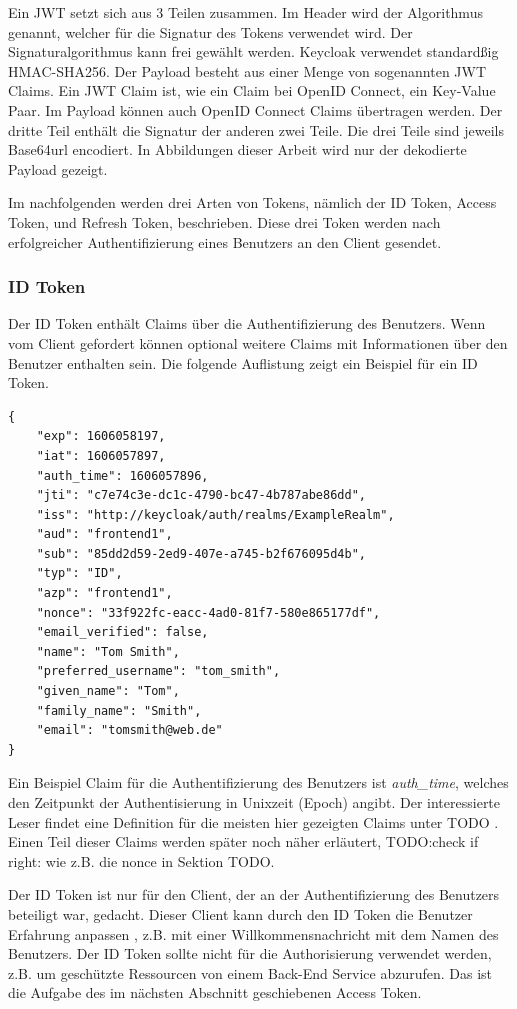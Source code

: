Ein JWT setzt sich aus 3 Teilen zusammen. Im Header wird der Algorithmus genannt, welcher für die Signatur des Tokens verwendet wird. Der Signaturalgorithmus kann frei gewählt werden. Keycloak verwendet standardßig HMAC-SHA256. Der Payload besteht aus einer Menge von sogenannten JWT Claims. Ein JWT Claim ist, wie ein Claim bei OpenID Connect, ein Key-Value Paar. Im Payload können auch OpenID Connect Claims übertragen werden. Der dritte Teil enthält die Signatur der anderen zwei Teile. Die drei Teile sind jeweils Base64url encodiert. In Abbildungen dieser Arbeit wird nur der dekodierte Payload gezeigt.

Im nachfolgenden werden drei Arten von Tokens, nämlich der ID Token, Access Token, und Refresh Token, beschrieben. Diese drei Token werden nach erfolgreicher Authentifizierung eines Benutzers an den Client gesendet.

\subsubsection{ID Token}

Der ID Token enthält Claims über die Authentifizierung des Benutzers. Wenn vom Client gefordert können optional weitere Claims mit Informationen über den Benutzer enthalten sein. Die folgende Auflistung zeigt ein Beispiel für ein ID Token.

\begin{lstlisting}[caption=Beispiel ID Token, captionpos=b]
{
	"exp": 1606058197,
	"iat": 1606057897,
	"auth_time": 1606057896,
	"jti": "c7e74c3e-dc1c-4790-bc47-4b787abe86dd",
	"iss": "http://keycloak/auth/realms/ExampleRealm",
	"aud": "frontend1",
	"sub": "85dd2d59-2ed9-407e-a745-b2f676095d4b",
	"typ": "ID",
	"azp": "frontend1",
	"nonce": "33f922fc-eacc-4ad0-81f7-580e865177df",
	"email_verified": false,
	"name": "Tom Smith",
	"preferred_username": "tom_smith",
	"given_name": "Tom",
	"family_name": "Smith",
	"email": "tomsmith@web.de"
}
\end{lstlisting}

Ein Beispiel Claim für die Authentifizierung des Benutzers ist \textit{auth\_time}, welches den Zeitpunkt der Authentisierung in Unixzeit (Epoch) angibt. Der interessierte Leser findet eine Definition für die meisten hier gezeigten Claims unter TODO \cite{EB7}. Einen Teil dieser Claims werden später noch näher erläutert, TODO:check if right: wie z.B. die nonce in Sektion TODO.

Der ID Token ist nur für den Client, der an der Authentifizierung des Benutzers beteiligt war, gedacht. Dieser Client kann durch den ID Token die Benutzer Erfahrung anpassen \cite{EB8}, z.B. mit einer Willkommensnachricht mit dem Namen des Benutzers. Der ID Token sollte nicht für die Authorisierung verwendet werden, z.B. um geschützte Ressourcen von einem Back-End Service abzurufen. Das ist die Aufgabe des im nächsten Abschnitt geschiebenen Access Token.

